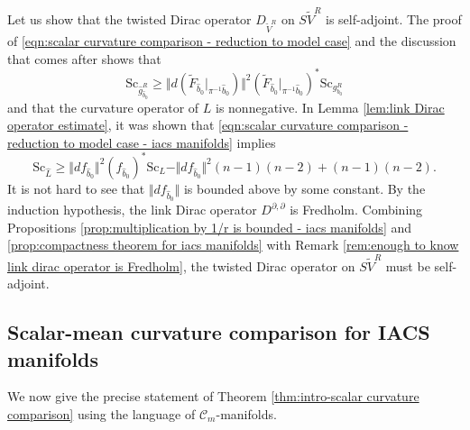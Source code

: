 \documentclass[12pt, reqno]{amsart}
\theoremstyle{plain} %
\theoremstyle{definition}
\theoremstyle{remark}
\numberwithin{equation}{section}
\newcommand{\dom}[1]{\hat{#1}}
\newcommand{\onorm}[1]{\Vert #1 \Vert}
\newcommand{\cat}[1]{\mathcal{#1}}
\newcommand{\Sc}{\mathrm{Sc}}
\begin{document}
Let us show that the twisted Dirac operator \(D_{\widetilde{V}^R}\) on \(S\widetilde{V}^R\) is self-adjoint.
The proof of \eqref{eqn:scalar curvature comparison - reduction to model case} and the discussion that comes after shows that
\begin{equation}\label{eqn:scalar curvature comparison - reduction to model case - iacs manifolds}
    \Sc_{\dom{g}_{\dom{b}_0}^R} \geq \onorm{d(\widetilde{F}_{\dom{b}_0}|_{\pi^{-1}\dom{b}_0})}^2 (\widetilde{F}_{\dom{b}_0}|_{\pi^{-1}\dom{b}_0})^*\Sc_{g_{b_0}^R}
\end{equation}
and that the curvature operator of \(L\) is nonnegative.
In Lemma \ref{lem:link Dirac operator estimate}, it was shown that \eqref{eqn:scalar curvature comparison - reduction to model case - iacs manifolds} implies
\begin{equation*}
    \Sc_{\dom{L}} \geq \onorm{df_{\dom{b}_0}}^2 (f_{\dom{b}_0})^*\Sc_L - \onorm{df_{\dom{b}_0}}^2 (n-1)(n-2) + (n-1)(n-2).
\end{equation*}
It is not hard to see that \(\onorm{df_{\dom{b}_0}}\) is bounded above by some constant.
By the induction hypothesis, the link Dirac operator \(D^{\partial, \partial}\) is Fredholm.
Combining Propositions \ref{prop:multiplication by 1/r is bounded - iacs manifolds} and \ref{prop:compactness theorem for iacs manifolds} with Remark \ref{rem:enough to know link dirac operator is Fredholm}, the twisted Dirac operator on \(S\widetilde{V}^R\) must be self-adjoint.

\subsection{Scalar-mean curvature comparison for IACS manifolds}
We now give the precise statement of Theorem \ref{thm:intro-scalar curvature comparison} using the language of \(\cat{C}_m\)-manifolds.
\end{document}
